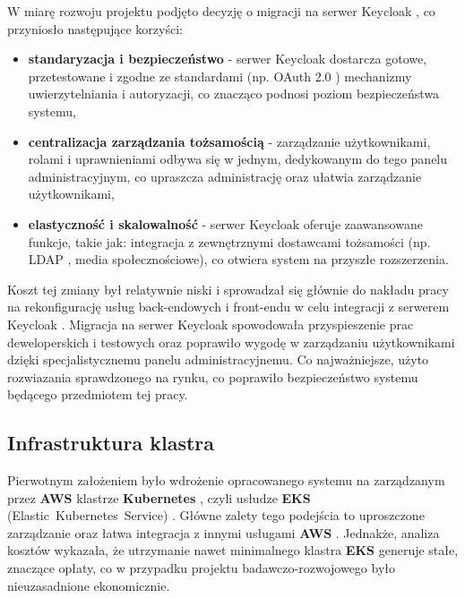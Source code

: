 W miarę rozwoju projektu podjęto decyzję o migracji na serwer Keycloak \cite{keycloak_docs}, co przyniosło następujące korzyści:
\begin{itemize}
    \item \textbf{standaryzacja i bezpieczeństwo} - serwer Keycloak \cite{keycloak_docs} dostarcza gotowe, przetestowane i zgodne ze standardami (np. OAuth 2.0 \cite{oauth2_rfc}) mechanizmy uwierzytelniania i autoryzacji, co znacząco podnosi poziom bezpieczeństwa systemu,
    \item \textbf{centralizacja zarządzania tożsamością} - zarządzanie użytkownikami, rolami i uprawnieniami odbywa się w jednym, dedykowanym do tego panelu administracyjnym, co upraszcza administrację oraz ułatwia zarządzanie użytkownikami,
    \item \textbf{elastyczność i skalowalność} - serwer Keycloak \cite{keycloak_docs} oferuje zaawansowane funkcje, takie jak: integracja z zewnętrznymi dostawcami tożsamości (np. LDAP \cite{ldap_rfc}, media społecznościowe), co otwiera system na przyszłe rozszerzenia.
\end{itemize}


Koszt tej zmiany był relatywnie niski i sprowadzał się głównie do nakładu pracy na rekonfigurację usług back-endowych i front-endu w celu integracji z serwerem Keycloak \cite{keycloak_docs}. Migracja na serwer Keycloak \cite{keycloak_docs} spowodowała przyspieszenie prac deweloperskich i testowych oraz poprawiło wygodę w zarządzaniu użytkownikami dzięki specjalistycznemu panelu administracyjnemu. Co najważniejsze, użyto rozwiazania sprawdzonego na rynku, co poprawiło bezpieczeństwo systemu będącego przedmiotem tej pracy.

\subsection{Infrastruktura klastra}

Pierwotnym założeniem było wdrożenie opracowanego systemu na zarządzanym przez \textbf{AWS} \cite{aws_docs} klastrze \textbf{Kubernetes} \cite{kubernetes}, czyli usłudze \textbf{EKS} (\mbox{Elastic Kubernetes Service}) \cite{eks_docs}. Główne zalety tego podejścia to uproszczone zarządzanie oraz łatwa integracja z innymi usługami \textbf{AWS} \cite{aws_docs}. Jednakże, analiza kosztów wykazała, że utrzymanie nawet minimalnego klastra \textbf{EKS} \cite{eks_docs} generuje stałe, znaczące opłaty, co w przypadku projektu badawczo-rozwojowego było nieuzasadnione ekonomicznie.

